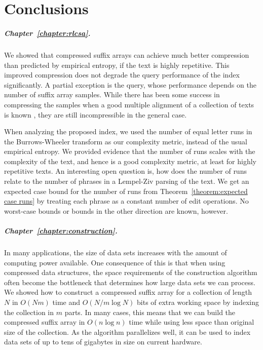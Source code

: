\chapter{Conclusions}\label{chapter:conclusions}

\paragraph{Chapter~\ref{chapter:rlcsa}.}

We showed that compressed suffix arrays can achieve much better compression than predicted by empirical entropy, if the text is highly repetitive. This improved compression does not degrade the query performance of the index significantly. A partial exception is the \locate{} query, whose performance depends on the number of suffix array samples. While there has been some success in compressing the samples when a good multiple alignment of a collection of texts is known \cite{Maekinen2010,Huang2010}, they are still incompressible in the general case.

When analyzing the proposed index, we used the number of equal letter runs in the Burrows-Wheeler transform as our complexity metric, instead of the usual empirical entropy. We provided evidence that the number of runs scales with the complexity of the text, and hence is a good complexity metric, at least for highly repetitive texts. An interesting open question is, how does the number of runs relate to the number of phrases in a Lempel-Ziv parsing of the text. We get an expected case bound for the number of runs from Theorem~\ref{theorem:expected case runs} by treating each phrase as a constant number of edit operations. No worst-case bounds or bounds in the other direction are known, however.

\paragraph{Chapter~\ref{chapter:construction}.}

In many applications, the size of data sets increases with the amount of computing power available. One consequence of this is that when using compressed data structures, the space requirements of the construction algorithm often become the bottleneck that determines how large data sets we can process. We showed how to construct a compressed suffix array for a collection of length $N$ in $O(Nm)$ time and $O(N/m \log N)$ bits of extra working space by indexing the collection in $m$ parts. In many cases, this means that we can build the compressed suffix array in $O(n \log n)$ time while using less space than original size of the collection. As the algorithm parallelizes well, it can be used to index data sets of up to tens of gigabytes in size on current hardware.

